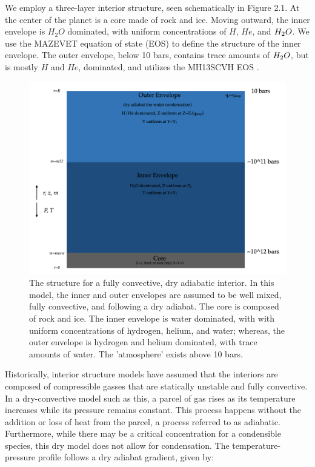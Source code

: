 \documentclass[11pt]{ucscthesisbs}
\begin{document}
We employ a three-layer interior structure, seen schematically in Figure 2.1. At the center of the planet is a core made of rock and ice. Moving outward, the inner envelope is $H_{2}O$ dominated, with uniform concentrations of $H$, $He$, and $H_{\rm{2}}O$. We use the MAZEVET equation of state (EOS) \citep{mazevet_2019} to define the structure of the inner envelope. The outer envelope, below 10 bars, contains trace amounts of $H_{\rm{2}}O$, but is mostly $H$ and $He$, dominated, and utilizes the MH13SCVH EOS \citep{miguel_2018}. 

\begin{figure}[ht!]
 \centerline{
  \includegraphics[width=6.0in]{figures/structure_schematic_images/structure_schematic_images.001.png}
 }
\caption[A Standard Interior Structure Model]
{The structure for a fully convective, dry adiabatic interior. In this model, the inner and outer envelopes are assumed to be well mixed, fully convective, and following a dry adiabat. The core is composed of rock and ice. The inner envelope is water dominated, with with uniform concentrations of hydrogen, helium, and water; whereas, the outer envelope is hydrogen and helium dominated, with trace amounts of water. The 'atmosphere' exists above 10 bars.}
\label{fig:standard_dry_interior}
\end{figure}

Historically, interior structure models have assumed that the interiors are composed of compressible gasses that are statically unstable and fully convective. In a dry-convective model such as this, a parcel of gas rises as its temperature increases while its pressure remains constant. This process happens without the addition or loss of heat from the parcel, a process referred to as adiabatic. Furthermore, while there may be a critical concentration for a condensible species, this dry model does not allow for condensation. The temperature-pressure profile follows a dry adiabat gradient\citep{kippenhahn_2012}, given by:
\end{document}
